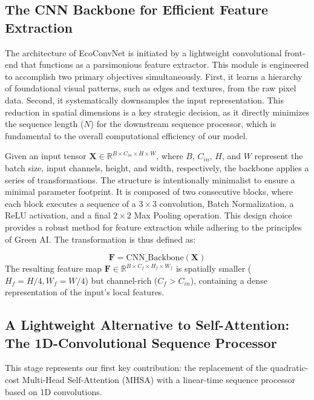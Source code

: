 \documentclass[12pt, a4paper]{article}
\begin{document}
\subsection{The CNN Backbone for Efficient Feature Extraction}
\label{ssec:cnn_backbone}

The architecture of EcoConvNet is initiated by a lightweight convolutional front-end that functions as a parsimonious feature extractor. This module is engineered to accomplish two primary objectives simultaneously. First, it learns a hierarchy of foundational visual patterns, such as edges and textures, from the raw pixel data. Second, it systematically downsamples the input representation. This reduction in spatial dimensions is a key strategic decision, as it directly minimizes the sequence length ($N$) for the downstream sequence processor, which is fundamental to the overall computational efficiency of our model.

Given an input tensor $\mathbf{X} \in \mathbb{R}^{B \times C_{in} \times H \times W}$, where $B$, $C_{in}$, $H$, and $W$ represent the batch size, input channels, height, and width, respectively, the backbone applies a series of transformations. The structure is intentionally minimalist to ensure a minimal parameter footprint. It is composed of two consecutive blocks, where each block executes a sequence of a $3 \times 3$ convolution, Batch Normalization, a ReLU activation, and a final $2 \times 2$ Max Pooling operation. This design choice provides a robust method for feature extraction while adhering to the principles of Green AI. The transformation is thus defined as:


\begin{equation}
\mathbf{F} = \text{CNN\_Backbone}(\mathbf{X})
\end{equation}
The resulting feature map $\mathbf{F} \in \mathbb{R}^{B \times C_{f} \times H_{f} \times W_{f}}$ is spatially smaller ($H_f = H/4, W_f = W/4$) but channel-rich ($C_f > C_{in}$), containing a dense representation of the input's local features.

\subsection{A Lightweight Alternative to Self-Attention: The 1D-Convolutional Sequence Processor}
\label{ssec:1d_conv_processor}

This stage represents our first key contribution: the replacement of the quadratic-cost Multi-Head Self-Attention (MHSA) with a linear-time sequence processor based on 1D convolutions.
\end{document}
